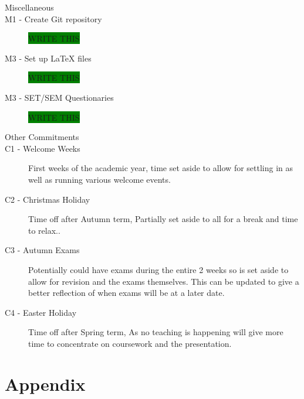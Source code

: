 \documentclass[a4paper]{article}
\begin{document}
\begin{description}
\item [\large{Miscellaneous}]
\item [M1 - Create Git repository]
\colorbox{green}{WRITE THIS}
\item [M3 - Set up LaTeX files]
\colorbox{green}{WRITE THIS}
\item [M3 - SET/SEM Questionaries]
\colorbox{green}{WRITE THIS}

\item [\large{Other Commitments}]
\item [C1 - Welcome Weeks]
First weeks of the academic year, time set aside to allow for settling in as well as running various welcome events.
\item [C2 - Christmas Holiday]
Time off after Autumn term, Partially set aside to all for a break and time to relax..
\item [C3 - Autumn Exams]
Potentially could have exams during the entire 2 weeks so is set aside to allow for revision and the exams themselves.
This can be updated to give a better reflection of when exams will be at a later date.
\item [C4 - Easter Holiday]
Time off after Spring term, As no teaching is happening will give more time to concentrate on coursework and the presentation.
\end{description}

\section{Appendix}


\end{document}
